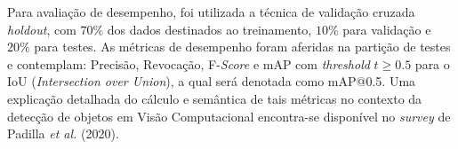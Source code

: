
Para avaliação de desempenho, foi utilizada a técnica de validação cruzada \emph{holdout}, com $70\%$ dos dados destinados ao treinamento, $10\%$ para validação e $20\%$ para testes. As métricas de desempenho foram aferidas na partição de testes e contemplam: Precisão, Revocação, F-\emph{Score} e mAP com \emph{threshold} $t \geq 0.5$ para o IoU (\emph{Intersection over Union}), a qual será denotada como mAP@0.5. Uma explicação detalhada do cálculo e semântica de tais métricas no contexto da detecção de objetos em Visão Computacional encontra-se disponível no \emph{survey} de Padilla \emph{et al.} (2020). \nocite{Survey:Metricas}
